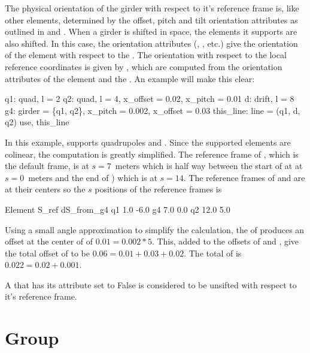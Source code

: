 The physical orientation of the girder with respect to it's reference
frame is, like other elements, determined by the offset, pitch and
tilt orientation attributes as outlined in  and
.  When a girder is shifted in space, the elements
it supports are also shifted.  In this case, the orientation
attributes (, , etc.) give the orientation of
the element with respect to the . The orientation with
respect to the local reference coordinates is given by
, which are computed from the orientation attributes
of the element and the . An example will make this clear:
\begin{example}
  q1: quad, l = 2
  q2: quad, l = 4, x_offset = 0.02, x_pitch = 0.01
  d: drift, l = 8
  g4: girder = \{q1, q2\}, x_pitch = 0.002, x_offset = 0.03
  this_line: line = (q1, d, q2)
  use, this_line
\end{example}
In this example,  supports quadrupoles  and .
Since the supported elements are colinear, the computation is greatly
simplified. The reference frame of , which is the default
 frame, is at $s = 7$~meters which is half way between the
start of  at at $s = 0$~meters and the end of ) which is
at $s = 14$. The reference frames of  and  are at their
centers so the $s$ positions of the reference frames is
\begin{example}
  Element        S_ref   dS_from_g4
  q1             1.0     -6.0
  g4             7.0      0.0
  q2            12.0      5.0
\end{example}
Using a small angle approximation to simplify the calculation, the
 of  produces an offset at the center of  of
$0.01 = 0.002 * 5$. This, added to the offsets of  and ,
give the total offset of  to be $0.06 = 0.01 + 0.03 + 0.02$.
The total  of  is $0.022 = 0.02 + 0.001$.

A  that has its  attribute set to False is considered to be
unsifted with respect to it's reference frame.

\section{Group}
\label{s:group}

